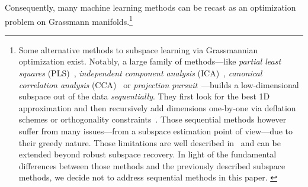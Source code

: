 Consequently, many machine learning methods can be recast as an optimization problem on Grassmann manifolds.\footnote{
Some alternative methods to subspace learning via Grassmannian optimization exist.
Notably, a large family of methods---like \textit{partial least squares} (PLS)~\citep{geladi_partial_1986}, \textit{independent component analysis} (ICA)~\citep{hyvarinen_independent_2000}, \textit{canonical correlation analysis} (CCA)~\citep{hardoon_canonical_2004} or \textit{projection pursuit}~\citep{huber_projection_1985}---builds a low-dimensional subspace out of the data \textit{sequentially}. They first look for the best 1D approximation and then recursively add dimensions one-by-one via deflation schemes or orthogonality constraints~\citep[Section~II.C]{lerman_overview_2018}.
Those sequential methods however suffer from many issues---from a subspace estimation point of view---due to their greedy nature. Those limitations are well described in~\citet[Section~III.B]{lerman_overview_2018} and can be extended beyond robust subspace recovery.
In light of the fundamental differences between those methods and the previously described subspace methods, we decide not to address sequential methods in this paper.
\label{footnote:sequential}
}

